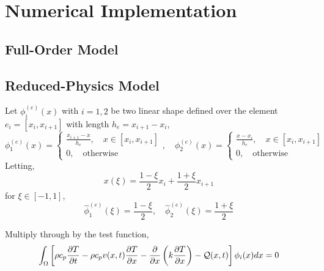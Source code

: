 \appendix

\section{Numerical Implementation}\label{app_implementation}

\subsection{Full-Order Model}

\subsection{Reduced-Physics Model}

Let $\phi^{(e)}_i(x)$ with $i=1,2$ be two linear shape defined over the element $e_i=[x_{i},x_{i+1}]$ with length $h_e=x_{i+1} - x_i$,
\begin{equation}
    \phi^{(e)}_1(x) = \left\{\begin{matrix}
        \frac{x_{i+1} - x}{h_e},\quad x\in[x_i,x_{i+1}]\\
        0, \quad \text{otherwise}
    \end{matrix}\right.,\quad\phi^{(e)}_2(x) = \left\{\begin{matrix}
        \frac{x - x_i}{h_e},\quad x\in[x_i,x_{i+1}]\\
        0, \quad \text{otherwise}
    \end{matrix}\right.
\end{equation}
Letting,
\[
    x(\xi) = \frac{1-\xi}{2}x_i + \frac{1 + \xi}{2}x_{i+1}
\]
for $\xi\in[-1,1]$,
\begin{equation}
    \hat{\phi}_1^{(e)}(\xi) = \frac{1 - \xi}{2},\quad \hat{\phi}_2^{(e)}(\xi) = \frac{1 + \xi}{2}
\end{equation}

Multiply through by the test function,
\begin{equation}
    \int_{\Omega}\left[\rho c_p\frac{\partial T}{\partial t} - \rho c_p v(x,t)\frac{\partial T}{\partial x} - \frac{\partial}{\partial x}\left(k\frac{\partial T}{\partial x}\right) - \mathcal{Q}(x,t)\right]\phi_i(x)dx = 0
\end{equation}

